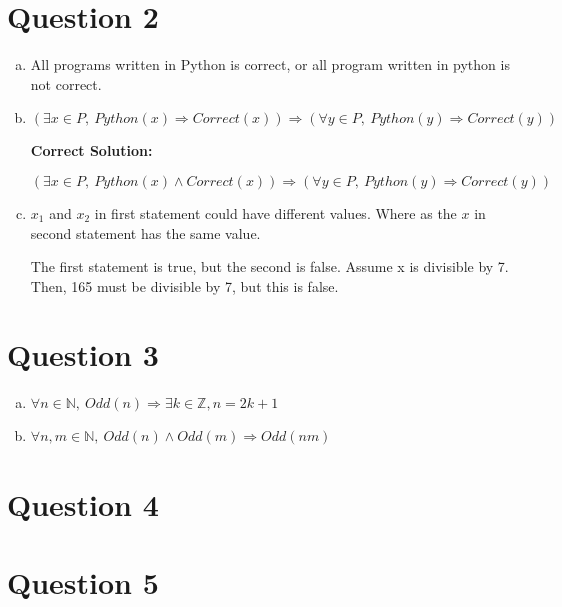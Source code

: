 \documentclass[12pt]{article}
\begin{document}
\section*{Question 2}
\begin{enumerate}[a.]
    \item

    All programs written in Python is correct, or all program written in python
    is not correct.

    \item

    $(\exists x \in P,\:Python(x) \Rightarrow Correct(x)) \Rightarrow (\forall y
    \in P,\:Python(y) \Rightarrow Correct(y))$

    \bigskip

    \textbf{Correct Solution:}

    $(\exists x \in P,\:Python(x) \land Correct(x)) \Rightarrow (\forall y \in P,\:
    Python(y) \Rightarrow Correct(y))$

    \item

    $x_1$ and $x_2$ in first statement could have different values. Where as the $x$ in
    second statement has the same value.

    \bigskip

    The first statement is true, but the second is false. Assume x is divisible by 7.
    Then, 165 must be divisible by 7, but this is false.

\end{enumerate}

\section*{Question 3}
\begin{enumerate}[a.]
    \item

    $\forall n \in \mathbb{N},\:Odd(n) \Rightarrow \exists k \in \mathbb{Z}, n = 2k + 1$

    \item

    $\forall n,m \in \mathbb{N},\:Odd(n) \land Odd(m) \Rightarrow Odd(nm)$

\end{enumerate}

\section*{Question 4}

\section*{Question 5}
\end{document}
